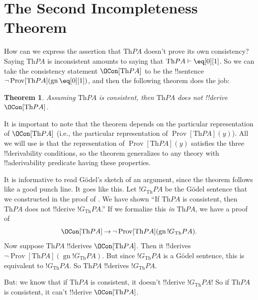 \documentclass[10pt,a4paper]{article}
\makeatletter
\theoremstyle{plain}
\newtheorem{thm}{Theorem}[section]
\theoremstyle{definition}
\theoremstyle{remark}
\newcommand*{\olfileid}[3]{}
\newcommand*{\olsection}[1]{\section*{#1}}
\newcommand*{\ollabel}[1]{\label{#1}}
\newcommand{\olref}{\@ifnextchar[{\olref@i}{\olref@final}}
\def\olref@i[#1]{\@ifnextchar[{\olref@ii}{\olref@final}}
\def\olref@ii[#1]{\@ifnextchar[{\olref@iii}{\olref@final}}
\def\olref@iii[#1]{\olref@final}
\def\olref@final#1{\ref{#1}}
\providecommand{\lif}{\mathbin{\rightarrow}}
\providecommand{\Proves}{\mathrel{\vdash}}
\providecommand{\Th}{\ensuremath{\mathrm{Th}}}
\providecommand{\Prov}{\operatorname{Prov}}
\providecommand{\gn}{\operatorname{gn}}
\providecommand{\OProv}{\operatorname{Prov}}
\makeatother
\begin{document}



\olfileid{inc}{inp}{2in}

\olsection{The Second Incompleteness Theorem}

How can we express the assertion that $\Th{PA}$ doesn't prove its own
consistency? Saying $\Th{PA}$ is inconsistent amounts to saying that
$\Th{PA} \Proves \eq[0][1]$. So we can take the consistency statement
$\OCon[\Th{PA}]$ to be the !!{sentence} $\lnot
\OProv[\Th{PA}](\gn{\eq[0][1]})$, and then the following theorem does
the job:

\begin{thm}
\ollabel{thm:second-incompleteness} 
Assuming $\Th{PA}$ is consistent, then $\Th{PA}$ does not !!{derive}
$\OCon[\Th{PA}]$.
\end{thm}

It is important to note that the theorem depends on the particular
representation of $\OCon[\Th{PA}]$ (i.e., the particular
representation of $\OProv[\Th{PA}](y)$). All we will use is that the
representation of $\OProv[\Th{PA}](y)$ satisfies the three
!!{derivability} conditions, so the theorem generalizes to any theory
with !!a{derivability} predicate having these properties.

It is informative to read G\"odel's sketch of an argument, since the
theorem follows like a good punch line. It goes like this. Let
$!G_\Th{PA}$ be the G\"odel sentence that we constructed in the proof
of \olref[1in]{thm:first-incompleteness}. We have shown ``If $\Th{PA}$
is consistent, then $\Th{PA}$ does not !!{derive} $!G_\Th{PA}$.'' If we
formalize this \emph{in} $\Th{PA}$, we have a proof of
\[
\OCon[\Th{PA}] \lif \lnot \OProv[\Th{PA}](\gn{!G_\Th{PA}}).
\]
Now suppose $\Th{PA}$ !!{derive}s $\OCon[\Th{PA}]$. Then it !!{derive}s $\lnot
\Prov[\Th{PA}](\gn{!G_\Th{PA}})$. But since $!G_\Th{PA}$ is a G\"odel
sentence, this is equivalent to $!G_\Th{PA}$. So $\Th{PA}$ !!{derive}s
$!G_\Th{PA}$.

But: we know that if $\Th{PA}$ is consistent, it doesn't !!{derive}
$!G_\Th{PA}$!{}  So if $\Th{PA}$ is consistent, it can't !!{derive}
$\OCon[\Th{PA}]$.
\end{document}
